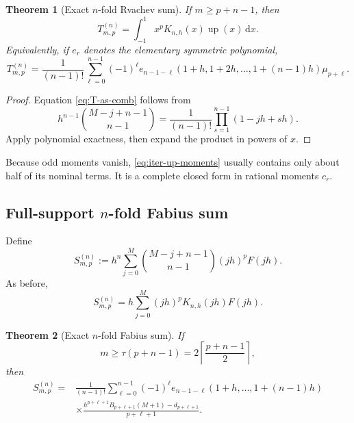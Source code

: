 \documentclass[11pt]{article}
\newtheorem{theorem}{Theorem}[section]
\theoremstyle{definition}
\newcommand{\Up}{\operatorname{up}}
\newcommand{\dd}{\,\mathrm{d}}
\begin{document}
\begin{theorem}[Exact $n$-fold Rvachev sum]
\label{thm:iterated-up}
If $m\ge p+n-1$, then
\begin{equation}
 \boxed{
 T_{m,p}^{(n)}
 =\int_{-1}^{1}x^pK_{n,h}(x)\Up(x)\dd x.}
 \label{eq:iter-up-integral}
\end{equation}
Equivalently, if $e_r$ denotes the elementary symmetric polynomial,
\begin{equation}
 T_{m,p}^{(n)}
 =\frac1{(n-1)!}
 \sum_{\ell=0}^{n-1}(-1)^\ell
 e_{n-1-\ell}(1+h,1+2h,\dots,1+(n-1)h)
 \mu_{p+\ell}.
 \label{eq:iter-up-moments}
\end{equation}
\end{theorem}

\begin{proof}
Equation \eqref{eq:T-as-comb} follows from
\[
 h^{n-1}\binom{M-j+n-1}{n-1}
 =\frac1{(n-1)!}\prod_{s=1}^{n-1}(1-jh+sh).
\]
Apply polynomial exactness, then expand the product in powers of $x$.
\end{proof}

Because odd moments vanish, \eqref{eq:iter-up-moments} usually contains only
about half of its nominal terms.  It is a complete closed form in rational
moments $c_r$.

\subsection{Full-support \texorpdfstring{$n$}{n}-fold Fabius sum}

Define
\begin{equation}
 S_{m,p}^{(n)}
 :=h^n\sum_{j=0}^{M}
 \binom{M-j+n-1}{n-1}(jh)^pF(jh).
 \label{eq:S-iter-F}
\end{equation}
As before,
\[
 S_{m,p}^{(n)}
 =h\sum_{j=0}^{M}(jh)^pK_{n,h}(jh)F(jh).
\]

\begin{theorem}[Exact $n$-fold Fabius sum]
\label{thm:iterated-F}
If
\begin{equation}
 m\ge\tau(p+n-1)=2\left\lceil\frac{p+n-1}{2}\right\rceil,
 \label{eq:iter-F-threshold}
\end{equation}
then
\begin{equation}
\boxed{
\begin{aligned}
 S_{m,p}^{(n)}={}&\frac1{(n-1)!}
 \sum_{\ell=0}^{n-1}(-1)^\ell
 e_{n-1-\ell}(1+h,\dots,1+(n-1)h)\\
 &\times
 \frac{h^{p+\ell+1}B_{p+\ell+1}(M+1)-d_{p+\ell+1}}
 {p+\ell+1}.
\end{aligned}}
\label{eq:iter-F-closed}
\end{equation}
\end{theorem}
\end{document}

